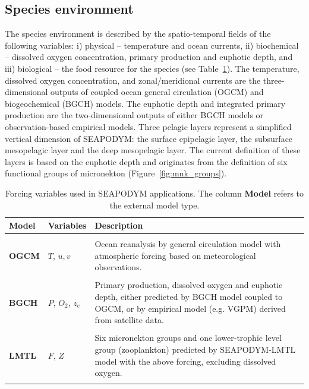 \subsection{Species environment}\label{sec:model-forcing}

The species environment is described by the spatio-temporal fields of the following variables: i) physical -- temperature and ocean currents, ii) biochemical -- dissolved oxygen concentration, primary production and euphotic depth, and iii) biological -- the food resource for the species (see Table~\ref{forcing}). The temperature, dissolved oxygen concentration, and zonal/meridional currents are the three-dimensional outputs of coupled ocean general circulation (OGCM) and biogeochemical (BGCH) models. The euphotic depth and integrated primary production are the two-dimensional outputs of either BGCH models or observation-based empirical models. Three pelagic layers represent a simplified vertical dimension of SEAPODYM: the surface epipelagic layer, the subsurface mesopelagic layer and the deep mesopelagic layer. The current definition of these layers is based on the euphotic depth and originates from the definition of six functional groups of micronekton (Figure~\ref{fig:mnk_groups}). 


\begin{table}
\caption{Forcing variables used in SEAPODYM applications. The column {\bfseries Model} refers to the external model type. }
\begin{tabular}{>{\bfseries}m{1.5cm}m{2.25cm}m{11.5cm}}
\hline
{Model} & {\textbf{Variables}} & {\textbf{ Description}}\\
\hline
\hline
\multicolumn{3}{c}{\cellcolor[gray]{0.8}\textit{Physical forcing}}\\
\footnotesize{OGCM} & $T$, $u,v$ &  Ocean reanalysis by general circulation model with atmospheric forcing based on meteorological observations. \\

\multicolumn{3}{c}{\cellcolor[gray]{0.8}\textit{Biogeochemical forcing}}\\

\footnotesize{BGCH} & $P$, $O_2$, $z_e$ & Primary production, dissolved oxygen and euphotic depth, either  predicted by BGCH model coupled to OGCM, or by empirical model (e.g. VGPM) derived from satellite data. \\


\multicolumn{3}{c}{\cellcolor[gray]{0.8}\textit{Biological forcing}}\\
\footnotesize{LMTL} & $F$, $Z$ & Six micronekton groups and one lower-trophic level group (zooplankton) predicted by SEAPODYM-LMTL model with the above forcing, excluding dissolved oxygen. \\
\hline
\label{forcing}
\end{tabular}
\end{table}

